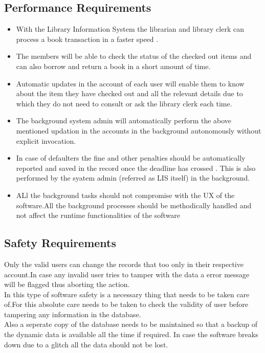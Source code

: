 \documentclass{article}
\begin{document}
\subsection{Performance Requirements}
\begin{itemize}
\item With the Library Information System the librarian and library clerk can process a book transaction in a faster speed .\\
\item The members will be able to check the status of the checked out items and can also borrow and return a book in a short amount of time.\\
\item Automatic updates in the account of each user will enable them to know about the item they have checked out and all the relevant details due to which they do not need to consult or ask the library clerk each time.\\
\item The background system admin will automatically perform the above mentioned updation in the accounts in the background autonomously without explicit invocation.\\
\item In case of defaulters the fine and other penalties should be automatically reported and saved in the record once the deadline has crossed . This is also performed by the syatem admin (referred as LIS itself) in the background.\\
\item ALl the background tasks should not compromise with the UX of the software.All the background processes should be methodically handled and not affect the runtime functionalities of the software
\end{itemize}


\subsection{Safety Requirements}
Only the valid users can change the records that too only in their respective account.In case any invalid user tries to tamper with the data a error message will be flagged thus aborting the action.\\
In this type of software safety is a necessary thing that needs to be taken care of.For this absolute care needs to be taken to check the validity of user before tampering any information in the database.
\\
Also a seperate copy of the database needs to be maintained so that a backup of the dynamic data is available all the time if required. In case the software breaks down due to a glitch all the data should not be lost.\\
\end{document}
